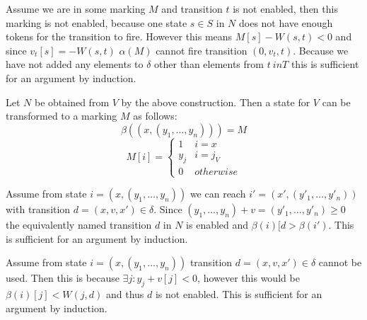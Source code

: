 Assume we are in some marking $M$ and transition $t$ is not enabled, then this marking is not enabled, because one state $s\in S$ in $N$ does not have enough tokens for the transition to fire. However this means $M[s]-W(s,t)<0$ and since $v_t[s]=-W(s,t)$ $\alpha(M)$ cannot fire transition $(0,v_t,t)$. Because we have not added any elements to $\delta$ other than elements from $t\ in T$ this is sufficient for an argument by induction.

Let $N$ be obtained from $V$ by the above construction. Then a state for $V$ can be transformed to a marking $M$ as follows:
\[\beta((x,(y_1,\dots,y_n)))=M\]
\[M[i]=
	\begin{cases} 
      1 & i=x\\
      y_j & i=j_V\\
      0 & otherwise
	\end{cases}\]
	
Assume from state $i=(x,(y_1,\dots,y_n))$ we can reach $i'=(x',(y'_1,\dots,y'_n))$ with transition $d=(x,v,x') \in \delta$. Since $(y_1,\dots,y_n)+v=(y'_1,\dots,y'_n) \geq 0$ the equivalently named transition $d$ in $N$ is enabled and $\beta(i)[d>\beta(i')$. This is sufficient for an argument by induction.

Assume from state $i=(x,(y_1,\dots,y_n))$ transition $d=(x,v,x') \in \delta$ cannot be used. Then this is because $\exists j:y_j+v[j]<0$, however this would be $\beta(i)[j]<W(j,d)$ and thus $d$ is not enabled. This is sufficient for an argument by induction.